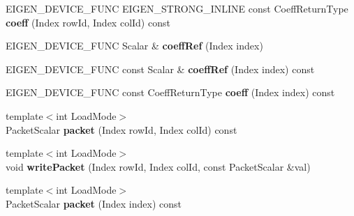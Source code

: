 \begin{DoxyCompactItemize}
E\+I\+G\+E\+N\+\_\+\+D\+E\+V\+I\+C\+E\+\_\+\+F\+U\+NC E\+I\+G\+E\+N\+\_\+\+S\+T\+R\+O\+N\+G\+\_\+\+I\+N\+L\+I\+NE const Coeff\+Return\+Type {\bfseries coeff} (Index row\+Id, Index col\+Id) const
\item 
\mbox{\label{class_eigen_1_1internal_1_1_block_impl__dense_a9f7f0e5c43d9230cc2fcae8f0a996d59}} 
E\+I\+G\+E\+N\+\_\+\+D\+E\+V\+I\+C\+E\+\_\+\+F\+U\+NC Scalar \& {\bfseries coeff\+Ref} (Index index)
\item 
\mbox{\label{class_eigen_1_1internal_1_1_block_impl__dense_a08ec8723ba5b7b42418993b75efa6509}} 
E\+I\+G\+E\+N\+\_\+\+D\+E\+V\+I\+C\+E\+\_\+\+F\+U\+NC const Scalar \& {\bfseries coeff\+Ref} (Index index) const
\item 
\mbox{\label{class_eigen_1_1internal_1_1_block_impl__dense_a3acaeaa2adcc188cde276bf87043f317}} 
E\+I\+G\+E\+N\+\_\+\+D\+E\+V\+I\+C\+E\+\_\+\+F\+U\+NC const Coeff\+Return\+Type {\bfseries coeff} (Index index) const
\item 
\mbox{\label{class_eigen_1_1internal_1_1_block_impl__dense_a417d701309282c0781b83cbd052a0a3b}} 
{\footnotesize template$<$int Load\+Mode$>$ }\\Packet\+Scalar {\bfseries packet} (Index row\+Id, Index col\+Id) const
\item 
\mbox{\label{class_eigen_1_1internal_1_1_block_impl__dense_aaeffe51db30fa700fb40e46727dc24db}} 
{\footnotesize template$<$int Load\+Mode$>$ }\\void {\bfseries write\+Packet} (Index row\+Id, Index col\+Id, const Packet\+Scalar \&val)
\item 
\mbox{\label{class_eigen_1_1internal_1_1_block_impl__dense_a56988e0d84a8bd0bc238a90dda7fb101}} 
{\footnotesize template$<$int Load\+Mode$>$ }\\Packet\+Scalar {\bfseries packet} (Index index) const
\item 
\mbox{\label{class_eigen_1_1internal_1_1_block_impl__dense_a1529a7640b9ee5fa3508366ea5e768c2}} 

\end{DoxyCompactItemize}
